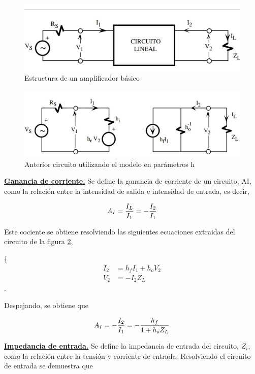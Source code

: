 \documentclass[10pt, a4paper]{article}
\begin{document}
    \begin{figure}[h!]
        \centering
        \includegraphics[height=4cm\textwidth]{amp-bas.jpg}
        \caption{Estructura de un amplificador básico}
        \label{fig:amp-bas}
    \end{figure}

    \begin{figure}[h!]
        \centering
        \includegraphics[height=4cm\textwidth]{amp-bas-h.jpg}
        \caption{Anterior circuito utilizando el modelo en parámetros h}
        \label{fig:amp-bas-h}
    \end{figure}

    \underline{\bf Ganancia de corriente.} Se define la ganancia de corriente de un circuito, AI, como la relación entre la intensidad de salida e intensidad de entrada, es decir,

    $$A_I = {I_L \over I_1} = -{I_2 \over I_1}$$

    Este cociente se obtiene resolviendo las siguientes ecuaciones extraidas del circuito de la figura \ref{fig:amp-bas-h},

    \left \{ \begin{equation*} %
        \begin{split}
            I_2 & = h_fI_1 + h_oV_2 \\
            V_2 & = -I_2Z_L 
        \end{split}
    \end{equation*} \right.

    Despejando, se obtiene que

    $$A_I = -{I_2 \over I_1} = -\frac{h_f}{1 + h_oZ_L}$$

    \underline{\bf Impedancia de entrada.} Se define la impedancia de entrada del circuito, $Z_i$, como la relación entre la tensión y corriente de entrada. Resolviendo el circuito de entrada se demuestra que
\end{document}
